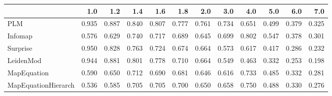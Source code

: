 \begin{tabular}{lrrrrrrrrrrr}
\toprule
{} &   1.0 &   1.2 &   1.4 &   1.6 &   1.8 &   2.0 &   3.0 &   4.0 &   5.0 &   6.0 &   7.0 \\
\midrule
PLM                 & 0.935 & 0.887 & 0.840 & 0.807 & 0.777 & 0.761 & 0.734 & 0.651 & 0.499 & 0.379 & 0.325 \\
Infomap             & 0.576 & 0.629 & 0.740 & 0.717 & 0.689 & 0.645 & 0.699 & 0.802 & 0.547 & 0.378 & 0.301 \\
Surprise            & 0.950 & 0.828 & 0.763 & 0.724 & 0.674 & 0.664 & 0.573 & 0.617 & 0.417 & 0.286 & 0.232 \\
LeidenMod           & 0.944 & 0.881 & 0.801 & 0.778 & 0.710 & 0.664 & 0.549 & 0.463 & 0.332 & 0.253 & 0.198 \\
MapEquation         & 0.590 & 0.650 & 0.712 & 0.690 & 0.681 & 0.646 & 0.616 & 0.733 & 0.485 & 0.332 & 0.281 \\
MapEquationHierarch & 0.536 & 0.585 & 0.705 & 0.705 & 0.700 & 0.650 & 0.658 & 0.750 & 0.488 & 0.330 & 0.276 \\
\bottomrule
\end{tabular}
